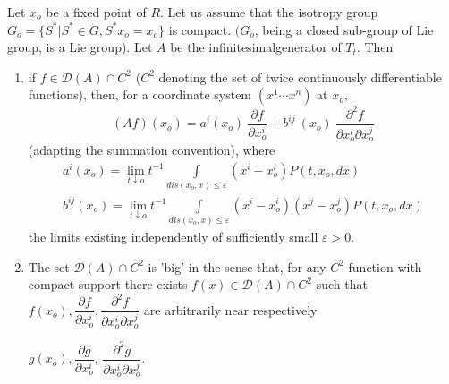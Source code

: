 \begin{theorem*}%
 Let $x_o$ be a fixed point of $R$. Let us assume that the isotropy
 group $G_o = \big \{ S^* | S^* \in G, S^* x_o = x_o \big \}$ is
 compact. $(G_o$, being a closed sub-group of Lie group, is a Lie
 group). Let $A$ be the infinitesimal\pageoriginale generator of $T_t$. Then 
 \begin{enumerate}[\rm (i)]
 \item if $f \in \mathscr{D} (A) \cap C^2$ ($C^2$ denoting the set of
  twice continuously differentiable functions), then, for a
  coordinate system $(x^1 \cdots x^n)$ at $x_o$, 
  $$
  (Af) (x_o) = a^i (x_o)~ \frac{\partial f}{\partial x_o^i} + b^{ij}
  ~(x_o)~ \frac{\partial^2 f}{\partial x^i_o \partial x^j_o} 
  $$
  (adapting the summation convention), where
  \begin{gather*}
   a^i (x_o) = \lim_{t \downarrow o} t^{-1} \int\limits_{dis (x_o,
    x) \le \varepsilon} (x^i - x^i_o ) P(t, x_o, dx)\\ 
   b^{ij} (x_o) = \lim_{t \downarrow o} t^{-1} \int\limits_{dis
    (x_o, x) \le \varepsilon} (x^i - x^i_o) (x^j - x^j_o) P(t,
   x_o, dx) 
  \end{gather*}
  the limits existing independently of sufficiently small
  $\varepsilon > 0$. 
 \item The set $\mathscr{D} (A) \cap C^2$ is 'big' in the sense that,
  for any $C^2$ function with compact support there exists $f(x) \in
  \mathscr{D}(A) \cap C^2$ such that $f(x_o), \dfrac{\partial
   f}{\partial x^i_o}, \dfrac{\partial^2 f}{\partial x^i_o \partial
   x^j_o}$ are arbitrarily near respectively 

  $g(x_o), \dfrac{\partial g}{\partial x^i_o}$, $\dfrac{\partial^2
   g}{\partial x^i_o \partial x^j_o}$. 
\end{enumerate} 
\end{theorem*}


